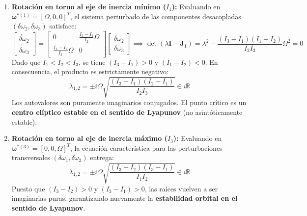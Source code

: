 \documentclass[11pt, a4paper]{article}
\begin{document}
\begin{enumerate}[leftmargin=*]
    \item \textbf{Rotación en torno al eje de inercia mínimo ($I_1$):}
    Evaluando en $\boldsymbol{\omega}^{*(1)} = [\Omega, 0, 0]^T$, el sistema perturbado de las componentes desacopladas $(\delta\omega_2, \delta\omega_3)$ satisface:
    \begin{equation}
    \begin{bmatrix} \dot{\delta\omega}_2 \\ \dot{\delta\omega}_3 \end{bmatrix} = \begin{bmatrix} 0 & \frac{I_3 - I_1}{I_2}\Omega \\ \frac{I_1 - I_2}{I_3}\Omega & 0 \end{bmatrix} \begin{bmatrix} \delta\omega_2 \\ \delta\omega_3 \end{bmatrix} \implies \det(\lambda \mathbf{I} - \mathbf{J}_1) = \lambda^2 - \frac{(I_3 - I_1)(I_1 - I_2)}{I_2 I_3}\Omega^2 = 0
    \end{equation}
    Dado que $I_1 < I_2 < I_3$, se tiene $(I_3 - I_1) > 0$ y $(I_1 - I_2) < 0$. En consecuencia, el producto es estrictamente negativo:
    \begin{equation}
    \lambda_{1,2} = \pm i \Omega \sqrt{\frac{(I_3 - I_1)(I_2 - I_1)}{I_2 I_3}} \in i\mathbb{R}
    \end{equation}
    Los autovalores son puramente imaginarios conjugados. El punto crítico es un \textbf{centro elíptico estable en el sentido de Lyapunov} (no asintóticamente estable).
    
    \item \textbf{Rotación en torno al eje de inercia máximo ($I_3$):}
    Evaluando en $\boldsymbol{\omega}^{*(3)} = [0, 0, \Omega]^T$, la ecuación característica para las perturbaciones transversales $(\delta\omega_1, \delta\omega_2)$ entrega:
    \begin{equation}
    \lambda_{1,2} = \pm i \Omega \sqrt{\frac{(I_3 - I_2)(I_3 - I_1)}{I_1 I_2}} \in i\mathbb{R}
    \end{equation}
    Puesto que $(I_3 - I_2) > 0$ y $(I_3 - I_1) > 0$, las raíces vuelven a ser imaginarias puras, garantizando nuevamente la \textbf{estabilidad orbital en el sentido de Lyapunov}.


\end{enumerate}
\end{document}
